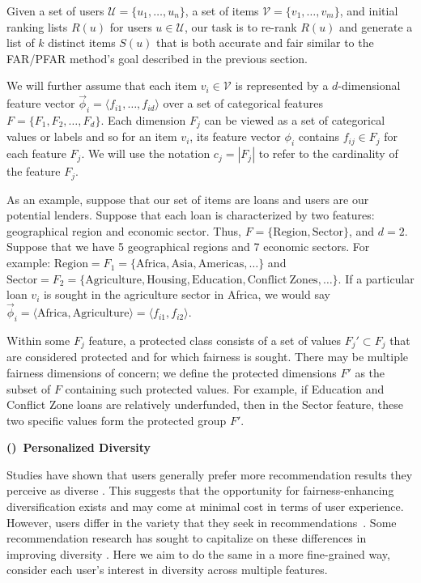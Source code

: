 Given a set of users $\mathcal U=\{u_1,\ldots,u_n\}$, a set of items $\mathcal V=\{v_1,\ldots,v_m\}$, and initial ranking lists $R(u)$ for users $u\in \mathcal U$, our task is to re-rank $R(u)$ and generate a list of $k$ distinct items $S(u)$ that is both accurate and fair similar to the FAR/PFAR method's goal \cite{liu2019personalized} described in the previous section.

We will further assume that each item $v_i\in\mathcal V$ is represented by a $d$-dimensional feature vector $\vec{\phi}_i = \langle f_{i1},\ldots,f_{id}\rangle$ over a set of categorical features $F = \{F_1, F_2, \ldots, F_d\}$. Each dimension $F_j$ can be viewed as a set of categorical values or labels and so for an item $v_i$, its feature vector $\phi_i$ contains $f_{ij} \in F_j$ for each feature $F_j$. We will use the notation $c_j = |F_j|$ to refer to the cardinality of the feature $F_{j}$.

As an example, suppose that our set of items are loans and users are our potential lenders. Suppose that each loan is characterized by two features: geographical region and economic sector. Thus, $F = \{\mathrm{Region}, \mathrm{Sector} \}$, and $d = 2$. Suppose that we have 5 geographical regions and 7 economic sectors. For example:  $\mathrm{Region} = F_1 = \{\mbox{Africa}, \mbox{Asia}, \mbox{Americas}, \ldots\}$ and $\mathrm{Sector} = F_2 = \{\mathrm{Agriculture}, \mathrm{Housing}, \mathrm{Education}, \mathrm{Conflict~Zones}, \ldots\}$. If a particular loan $v_i$ is sought in the agriculture sector in Africa, we would say $\vec{\phi}_i = \langle \mathrm{Africa}, \mathrm{Agriculture} \rangle = \langle f_{i1}, f_{i2} \rangle$.

Within some $F_j$ feature, a protected class consists of a set of values $F_j' \subset F_j$ that are considered protected and for which fairness is sought. There may be multiple fairness dimensions of concern; we define the protected dimensions  $F'$ as the subset of $F$ containing such protected values. For example, if Education and Conflict Zone loans are relatively underfunded, then in the Sector feature, these two specific values form the protected group $F'$. 

\vspace{0.25cm}
\noindent \textbf{()~Personalized Diversity}
\vspace{0.25cm}

Studies have shown that users generally prefer more recommendation results they perceive as diverse \cite{hu2011enhancing}. This suggests that the opportunity for fairness-enhancing diversification exists and may come at minimal cost in terms of user experience. However, users differ in the variety that they seek in recommendations~\cite{tintarev2013adapting}. Some recommendation research has sought to capitalize on these differences in improving diversity \cite{eskandanianuser_2016}. Here we aim to do the same in a more fine-grained way, consider each user's interest in diversity across multiple features.

